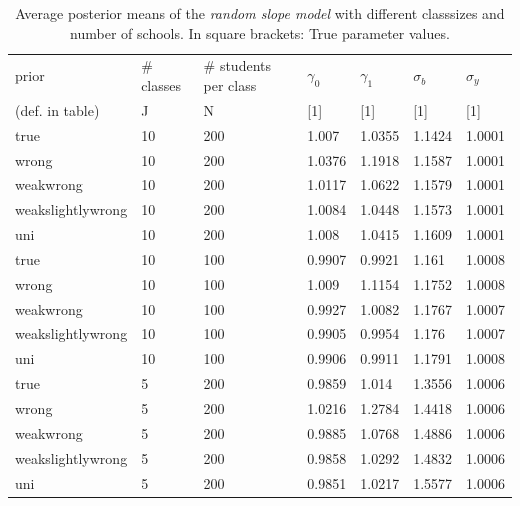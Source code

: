 \begin{table}[H]
\begin{center}
\begin{tabular}{l  l  l  l  l  l  l  }
prior & \# classes & \#  students per class & $\gamma_0$ & $\gamma_1$  & $\sigma_b$ & $\sigma_y$ \\
(def. in table)  & J  & N &  [1] &  [1]  & [1] & [1] \\
\hline
true & 10  &  200  &  1.007  &  1.0355  &  1.1424  &  1.0001\\
wrong & 10  &  200  &  1.0376  &  1.1918  &  1.1587  &  1.0001\\
weakwrong & 10  &  200  &  1.0117  &  1.0622  &  1.1579  &  1.0001\\
weakslightlywrong & 10  &  200  &  1.0084  &  1.0448  &  1.1573  &  1.0001\\
uni &10  &  200  &  1.008  &  1.0415  &  1.1609  &  1.0001\\
\hline
true &10  &  100  &  0.9907  &  0.9921  &  1.161  &  1.0008\\
wrong & 10  &  100  &  1.009  &  1.1154  &  1.1752  &  1.0008\\
weakwrong & 10  &  100  &  0.9927  &  1.0082  &  1.1767  &  1.0007\\
weakslightlywrong & 10  &  100  &  0.9905  &  0.9954  &  1.176  &  1.0007\\
uni & 10  &  100  &  0.9906  &  0.9911  &  1.1791  &  1.0008\\
\hline
true & 5  &  200  &  0.9859  &  1.014  &  1.3556  &  1.0006\\
wrong & 5  &  200  &  1.0216  &  1.2784  &  1.4418  &  1.0006\\
weakwrong & 5  &  200  &  0.9885  &  1.0768  &  1.4886  &  1.0006\\
weakslightlywrong& 5  &  200  &  0.9858  &  1.0292  &  1.4832  &  1.0006\\
uni & 5  &  200  &  0.9851  &  1.0217  &  1.5577  &  1.0006\\
\end{tabular}
\end{center}
\caption{Average  posterior means of the \emph{random slope model}  with different classsizes and number of schools. In square brackets: True parameter values.}
\label{tab:bias_second}
\end{table}


